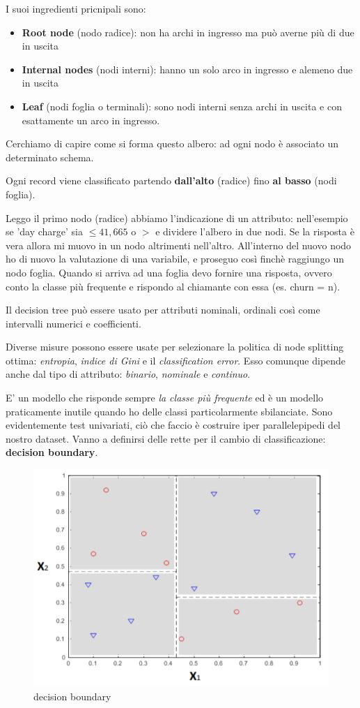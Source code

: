 I suoi ingredienti pricnipali sono:
\begin{itemize}
	\item \textbf{Root node} (nodo radice): non ha archi in ingresso ma può averne più di due in uscita
	\item \textbf{Internal nodes} (nodi interni): hanno un solo arco in ingresso e alemeno due in uscita
	\item \textbf{Leaf} (nodi foglia o terminali): sono nodi interni senza archi in uscita e con esattamente un arco in ingresso.
\end{itemize}

Cerchiamo di capire come si forma questo albero: ad ogni nodo è associato un determinato schema.

Ogni record viene classificato partendo \textbf{dall'alto} (radice) fino \textbf{al basso} (nodi foglia).

Leggo il primo nodo (radice) abbiamo l'indicazione di un attributo: nell'esempio se 'day charge' sia $\le 41,665$ o  $>$ e dividere l'albero in due nodi. Se la risposta è vera allora mi muovo in un nodo altrimenti nell'altro. All'interno del nuovo nodo ho di nuovo la valutazione di una variabile, e proseguo cos\`i finch\`e raggiungo un nodo foglia.
Quando si arriva ad una foglia devo fornire una risposta, ovvero conto la classe più frequente e rispondo al chiamante con essa (es. churn = n).

Il decision tree può essere usato per attributi nominali, ordinali così come intervalli numerici e coefficienti.
 
Diverse misure possono essere usate per selezionare la politica di node splitting ottima: \textit{entropia}, \textit{indice di Gini} e il \textit{classification error}. Esso comunque dipende anche dal tipo di attributo: \textit{binario}, \textit{nominale} e \textit{continuo}. 

E' un modello che risponde sempre \textit{la classe più frequente} ed è un modello praticamente inutile quando ho delle classi particolarmente sbilanciate. Sono evidentemente test univariati, ciò che faccio è costruire iper parallelepipedi del nostro dataset. Vanno a definirsi delle rette per il cambio di classificazione: \textbf{decision boundary}.

\begin{figure}[H]
	\centering
	\includegraphics[height=0.5 \linewidth]{classification/pict/decision_boundary.png}
	\caption{decision boundary}
\end{figure}

